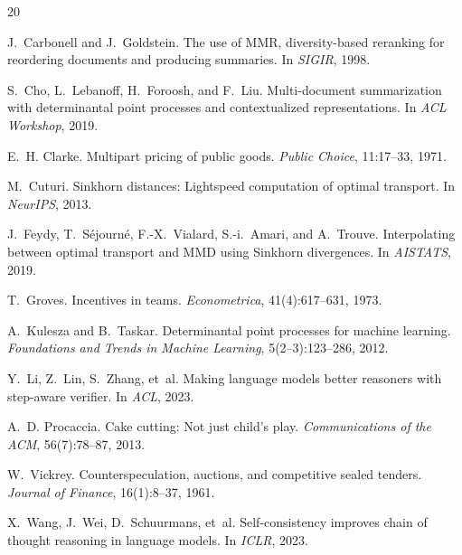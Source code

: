 \documentclass[10pt]{article}
\begin{document}

\begin{thebibliography}{20}

J.~Carbonell and J.~Goldstein.
\newblock The use of MMR, diversity-based reranking for reordering documents and producing summaries.
\newblock In \emph{SIGIR}, 1998.

S.~Cho, L.~Lebanoff, H.~Foroosh, and F.~Liu.
\newblock Multi-document summarization with determinantal point processes and contextualized representations.
\newblock In \emph{ACL Workshop}, 2019.

E.~H. Clarke.
\newblock Multipart pricing of public goods.
\newblock \emph{Public Choice}, 11:17--33, 1971.

M.~Cuturi.
\newblock Sinkhorn distances: Lightspeed computation of optimal transport.
\newblock In \emph{NeurIPS}, 2013.

J.~Feydy, T.~S\'{e}journ\'{e}, F.-X.~Vialard, S.-i.~Amari, and A.~Trouve.
\newblock Interpolating between optimal transport and MMD using Sinkhorn divergences.
\newblock In \emph{AISTATS}, 2019.

T.~Groves.
\newblock Incentives in teams.
\newblock \emph{Econometrica}, 41(4):617--631, 1973.

A.~Kulesza and B.~Taskar.
\newblock Determinantal point processes for machine learning.
\newblock \emph{Foundations and Trends in Machine Learning}, 5(2--3):123--286, 2012.

Y.~Li, Z.~Lin, S.~Zhang, et~al.
\newblock Making language models better reasoners with step-aware verifier.
\newblock In \emph{ACL}, 2023.

A.~D. Procaccia.
\newblock Cake cutting: Not just child's play.
\newblock \emph{Communications of the ACM}, 56(7):78--87, 2013.

W.~Vickrey.
\newblock Counterspeculation, auctions, and competitive sealed tenders.
\newblock \emph{Journal of Finance}, 16(1):8--37, 1961.

X.~Wang, J.~Wei, D.~Schuurmans, et~al.
\newblock Self-consistency improves chain of thought reasoning in language models.
\newblock In \emph{ICLR}, 2023.

\end{thebibliography}
\end{document}
